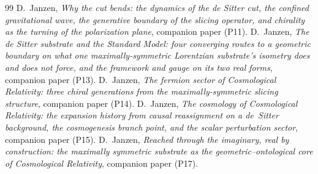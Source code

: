 \documentclass[11pt,a4paper]{article}
\theoremstyle{plain}
\theoremstyle{definition}
\theoremstyle{remark}
\begin{document}
\begin{thebibliography}{99}
 D.~Janzen, \emph{Why the cut bends: the dynamics of the de Sitter cut, the confined gravitational wave, the generative boundary of the slicing operator, and chirality as the turning of the polarization plane}, companion paper (P11).
 D.~Janzen, \emph{The de Sitter substrate and the Standard Model: four converging routes to a geometric boundary on what one maximally-symmetric Lorentzian substrate's isometry does and does not force, and the framework and gauge on its two real forms}, companion paper (P13).
 D.~Janzen, \emph{The fermion sector of Cosmological Relativity: three chiral generations from the maximally-symmetric slicing structure}, companion paper (P14).
 D.~Janzen, \emph{The cosmology of Cosmological Relativity: the expansion history from causal reassignment on a de~Sitter background, the cosmogenesis branch point, and the scalar perturbation sector}, companion paper (P15).
 D.~Janzen, \emph{Reached through the imaginary, real by construction: the maximally symmetric substrate as the geometric--ontological core of Cosmological Relativity}, companion paper (P17).


\end{thebibliography}
\end{document}
